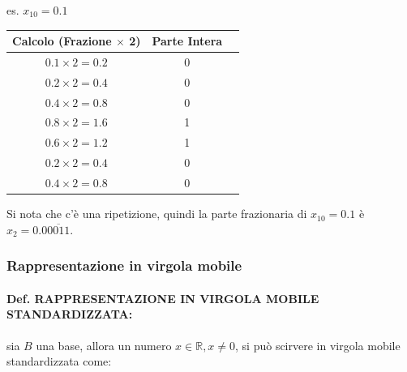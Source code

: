\documentclass[a4paper, 11pt]{article}
\begin{document}
\begin{itemize}
                es. $x_{10} = 0.1$



                \begin{table}[ht]
                    \centering
                    \begin{tabular}{|c|c|c|}
                    \hline
                    \textbf{Calcolo (Frazione $\times$ 2)} & \textbf{Parte Intera} \\ 
                    \hline
                    $0.1 \times 2 = 0.2$ & 0 \\ 
                    \hline
                    $0.2 \times 2 = 0.4$ & 0 \\ 
                    \hline
                    $0.4 \times 2 = 0.8$ & 0 \\ 
                    \hline
                    $0.8 \times 2 = 1.6$ & 1 \\ 
                    \hline
                    $0.6 \times 2 = 1.2$ & 1 \\ 
                    \hline
                    $0.2 \times 2 = 0.4$ & 0 \\ 
                    \hline
                    $0.4 \times 2 = 0.8$ & 0 \\ 
                    \hline
                    \end{tabular}
                    \label{tab:divisione_binaria}
                \end{table}



                Si nota che c'è una ripetizione, quindi la parte frazionaria di $x_{10} = 0.1$ è $x_{2} = 0.0\overline{0011}$.

            \end{itemize}



        \subsubsection{Rappresentazione in virgola mobile}

            \paragraph{Def. RAPPRESENTAZIONE IN VIRGOLA MOBILE STANDARDIZZATA: }

            sia $B$ una base, allora un numero $x \in \mathbb{R}, x \neq 0$, si può scirvere in virgola mobile standardizzata come: 
\end{document}
